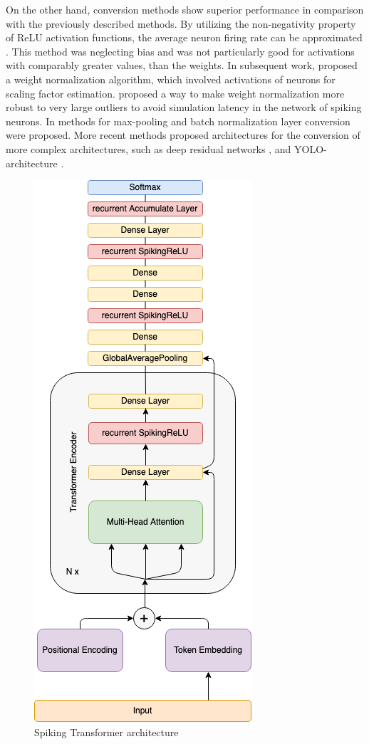 \documentclass{article}
\begin{document}
On the other hand, conversion methods show superior performance in comparison with the previously described methods. By utilizing the non-negativity property of ReLU activation functions, the average neuron firing rate can be approximated \cite{conversion_first}. This method was neglecting bias and was not particularly good for activations with comparably greater values, than the weights. In subsequent work, \cite{diehl_fast_classifying} proposed a weight normalization algorithm, which involved activations of neurons for scaling factor estimation. \cite{rueckauer2016theory} proposed a way to make weight normalization more robust to very large outliers to avoid simulation latency in the network of spiking neurons. In \cite{conversion_continuous_valued} methods for max-pooling and batch normalization layer conversion were proposed. More recent methods proposed architectures for the conversion of more complex architectures, such as deep residual networks \cite{hu2020spiking}, \cite{deeper_spiking} and YOLO-architecture \cite{kim2019spikingyolo}. 

\begin{figure}[b!]
\begin{center}
\includegraphics[width=0.4 \textwidth]{SpikingTransformer.png}
\caption{Spiking Transformer architecture}
\label{fig:transformer}
\end{center}
\end{figure}
\end{document}
